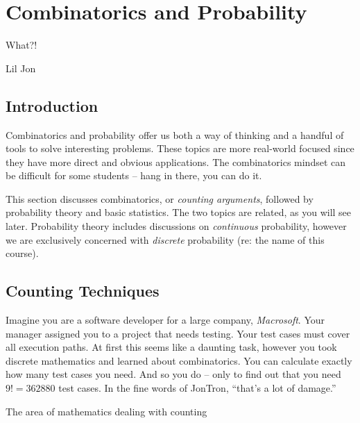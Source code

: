 \documentclass[main.tex]{subfiles}
\begin{document}
\chapter{Combinatorics and Probability}
\label{chapter:comb-prob}

\epigraph{What?!}{Lil Jon}

\minitoc

\section{Introduction}

Combinatorics and probability offer us both a way of thinking and a handful of tools to solve interesting problems. These topics are more real-world focused since they have more direct and obvious applications. The combinatorics mindset can be difficult for some students -- hang in there, you can do it.

This section discusses combinatorics, or \textit{counting arguments}, followed by probability theory and basic statistics. The two topics are related, as you will see later. Probability theory includes discussions on \textit{continuous} probability, however we are exclusively concerned with \textit{discrete} probability (re: the name of this course).

\section{Counting Techniques}

Imagine you are a software developer for a large company, \textit{Macrosoft}. Your manager assigned you to a project that needs testing. Your test cases must cover all execution paths. At first this seems like a daunting task, however you took discrete mathematics and learned about combinatorics. You can calculate exactly how many test cases you need. And so you do -- only to find out that you need \(9! = 362880\) test cases. In the fine words of JonTron, ``that's a lot of damage.''

\begin{defn}
	The area of mathematics dealing with counting
\end{defn}

\end{document}
